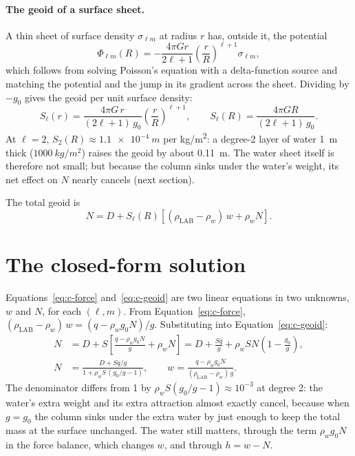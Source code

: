 \paragraph{The geoid of a surface sheet.}
A thin sheet of surface density $\sigma_{\ell m}$ at radius $r$ has, outside it, the potential
\begin{equation}
    \Phi_{\ell m}(R) = -\frac{4\pi G r}{2\ell+1}\left(\frac{r}{R}\right)^{\ell+1}\sigma_{\ell m},
\end{equation}
which follows from solving Poisson's equation with a delta-function source and matching the potential and the jump in its gradient across the sheet.
Dividing by $-g_0$ gives the geoid per unit surface density:
\begin{equation}
    S_\ell(r) = \frac{4\pi G\,r}{(2\ell+1)\,g_0}\left(\frac{r}{R}\right)^{\ell+1}, \qquad
    S_\ell(R) = \frac{4\pi G R}{(2\ell+1)\,g_0}.
\end{equation}
At $\ell=2$, $S_2(R)\approx \qty{1.1e-4}{m}$ per \si{kg/m^2}: a degree-2 layer of water \qty{1}{m} thick ($\qty{1000}{kg/m^2}$) raises the geoid by about \qty{0.11}{m}.
The water sheet itself is therefore not small; but because the column sinks under the water's weight, its net effect on $N$ nearly cancels (next section).

The total geoid is
\begin{equation}
    N = D + S_\ell(R)\left[(\rho_{\mathrm{LAB}}-\rho_w)\,w + \rho_w N\right] .
    \label{eq:c-geoid}
\end{equation}

\section{The closed-form solution}

Equations~\eqref{eq:c-force} and~\eqref{eq:c-geoid} are two linear equations in two unknowns, $w$ and $N$, for each $(\ell,m)$.
From Equation~\eqref{eq:c-force}, $(\rho_{\mathrm{LAB}}-\rho_w)\,w = (q-\rho_w g_0 N)/g$.
Substituting into Equation~\eqref{eq:c-geoid}:
\begin{align}
    N &= D + S\left[\frac{q-\rho_w g_0 N}{g} + \rho_w N\right]
       = D + \frac{S q}{g} + \rho_w S N\left(1-\frac{g_0}{g}\right), \\
    N &= \frac{D + S q/g}{1 + \rho_w S\,(g_0/g - 1)} ,
    \qquad
    w = \frac{q - \rho_w g_0 N}{(\rho_{\mathrm{LAB}}-\rho_w)\,g} .
\end{align}
The denominator differs from 1 by $\rho_w S (g_0/g-1) \approx 10^{-3}$ at degree 2: the water's extra weight and its extra attraction almost exactly cancel, because when $g=g_0$ the column sinks under the extra water by just enough to keep the total mass at the surface unchanged.
The water still matters, through the term $\rho_w g_0 N$ in the force balance, which changes $w$, and through $h=w-N$.

